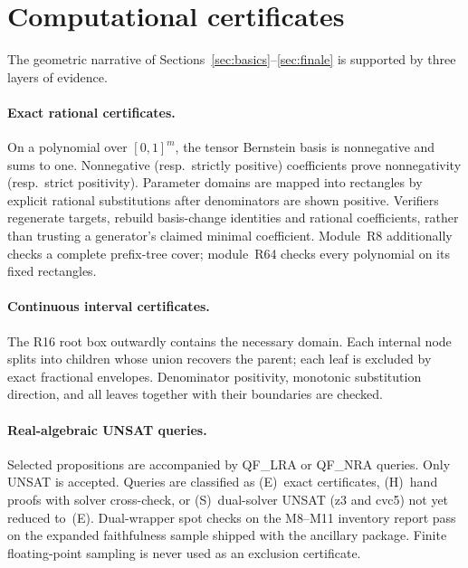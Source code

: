 \documentclass[11pt,reqno]{amsart}
\theoremstyle{definition}
\begin{document}
\section{Computational certificates}\label{sec:certs}

The geometric narrative of Sections~\ref{sec:basics}--\ref{sec:finale} is
supported by three layers of evidence.

\paragraph{Exact rational certificates.}
On a polynomial over $[0,1]^m$, the tensor Bernstein basis is nonnegative and
sums to one.  Nonnegative (resp.\ strictly positive) coefficients prove
nonnegativity (resp.\ strict positivity).  Parameter domains are mapped into
rectangles by explicit rational substitutions after denominators are shown
positive.  Verifiers regenerate targets, rebuild basis-change identities and
rational coefficients, rather than trusting a generator's claimed minimal
coefficient.  Module~R8 additionally checks a complete prefix-tree cover;
module~R64 checks every polynomial on its fixed rectangles.

\paragraph{Continuous interval certificates.}
The R16 root box outwardly contains the necessary domain.  Each internal node
splits into children whose union recovers the parent; each leaf is excluded by
exact fractional envelopes.  Denominator positivity, monotonic substitution
direction, and all leaves together with their boundaries are checked.

\paragraph{Real-algebraic UNSAT queries.}
Selected propositions are accompanied by QF\_LRA or QF\_NRA queries.  Only
UNSAT is accepted.  Queries are classified as (E)~exact certificates,
(H)~hand proofs with solver cross-check, or (S)~dual-solver UNSAT (z3 and
cvc5) not yet reduced to~(E).  Dual-wrapper spot checks on the M8--M11
inventory report pass on the expanded faithfulness sample shipped with the
ancillary package.  Finite floating-point sampling is never used as an
exclusion certificate.
\end{document}
